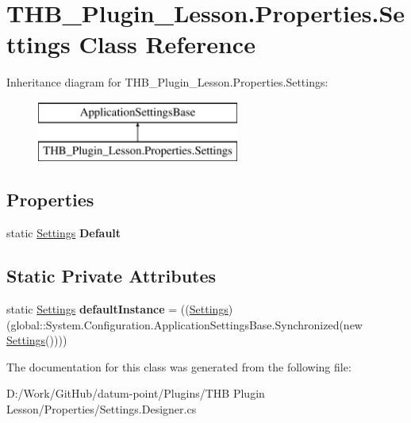 \hypertarget{class_t_h_b___plugin___lesson_1_1_properties_1_1_settings}{}\section{T\+H\+B\+\_\+\+Plugin\+\_\+\+Lesson.\+Properties.\+Settings Class Reference}
\label{class_t_h_b___plugin___lesson_1_1_properties_1_1_settings}
Inheritance diagram for T\+H\+B\+\_\+\+Plugin\+\_\+\+Lesson.\+Properties.\+Settings\+:\begin{figure}[H]
\begin{center}
\leavevmode
\includegraphics[height=2.000000cm]{d2/d6c/class_t_h_b___plugin___lesson_1_1_properties_1_1_settings}
\end{center}
\end{figure}
\subsection*{Properties}
\begin{DoxyCompactItemize}
\item 
\mbox{\label{class_t_h_b___plugin___lesson_1_1_properties_1_1_settings_a62c075a5b387e28e65836510eb611744}} 
static \mbox{\hyperlink{class_t_h_b___plugin___lesson_1_1_properties_1_1_settings}{Settings}} {\bfseries Default}
\end{DoxyCompactItemize}
\subsection*{Static Private Attributes}
\begin{DoxyCompactItemize}
\item 
\mbox{\label{class_t_h_b___plugin___lesson_1_1_properties_1_1_settings_a3468ef1e17fceecd069556491bd2fd4d}} 
static \mbox{\hyperlink{class_t_h_b___plugin___lesson_1_1_properties_1_1_settings}{Settings}} {\bfseries default\+Instance} = ((\mbox{\hyperlink{class_t_h_b___plugin___lesson_1_1_properties_1_1_settings}{Settings}})(global\+::\+System.\+Configuration.\+Application\+Settings\+Base.\+Synchronized(new \mbox{\hyperlink{class_t_h_b___plugin___lesson_1_1_properties_1_1_settings}{Settings}}())))
\end{DoxyCompactItemize}


The documentation for this class was generated from the following file\+:\begin{DoxyCompactItemize}
\item 
D\+:/\+Work/\+Git\+Hub/datum-\/point/\+Plugins/\+T\+H\+B Plugin Lesson/\+Properties/Settings.\+Designer.\+cs\end{DoxyCompactItemize}
